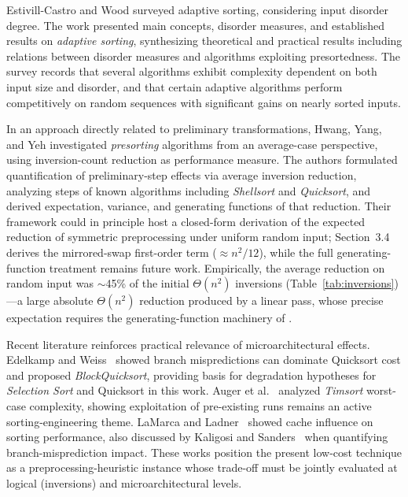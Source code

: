 \documentclass[namedate,webpdf,contemporary,large]{TBench-template}%
\theoremstyle{thmstyleone}%
\theoremstyle{thmstyletwo}%
\theoremstyle{thmstylethree}%
\begin{document}
Estivill-Castro and Wood \cite{estivill-castro_survey_1992} surveyed adaptive sorting, considering input disorder degree. The work presented main concepts, disorder measures, and established results on \emph{adaptive sorting}, synthesizing theoretical and practical results including relations between disorder measures and algorithms exploiting presortedness. The survey records that several algorithms exhibit complexity dependent on both input size and disorder, and that certain adaptive algorithms perform competitively on random sequences with significant gains on nearly sorted inputs.

In an approach directly related to preliminary transformations, Hwang, Yang, and Yeh \cite{hwang_presorting_2000} investigated \emph{presorting} algorithms from an average-case perspective, using inversion-count reduction as performance measure. The authors formulated quantification of preliminary-step effects via average inversion reduction, analyzing steps of known algorithms including \emph{Shellsort} and \emph{Quicksort}, and derived expectation, variance, and generating functions of that reduction. Their framework could in principle host a closed-form derivation of the expected reduction of symmetric preprocessing under uniform random input; Section~3.4 derives the mirrored-swap first-order term ($\approx n^2/12$), while the full generating-function treatment remains future work. Empirically, the average reduction on random input was $\sim$45\% of the initial $\Theta(n^2)$ inversions (Table~\ref{tab:inversions})---a large absolute $\Theta(n^2)$ reduction produced by a linear pass, whose precise expectation requires the generating-function machinery of \cite{hwang_presorting_2000}.

Recent literature reinforces practical relevance of microarchitectural effects. Edelkamp and Weiss~\cite{edelkamp_blockquicksort_2016} showed branch mispredictions can dominate Quicksort cost and proposed \emph{BlockQuicksort}, providing basis for degradation hypotheses for \emph{Selection Sort} and Quicksort in this work. Auger et al.~\cite{auger_timsort_2018} analyzed \emph{Timsort} worst-case complexity, showing exploitation of pre-existing runs remains an active sorting-engineering theme. LaMarca and Ladner~\cite{lamarca_influence_1999} showed cache influence on sorting performance, also discussed by Kaligosi and Sanders~\cite{kaligosi_branch_2006} when quantifying branch-misprediction impact. These works position the present low-cost technique as a preprocessing-heuristic instance whose trade-off must be jointly evaluated at logical (inversions) and microarchitectural levels.
\end{document}
